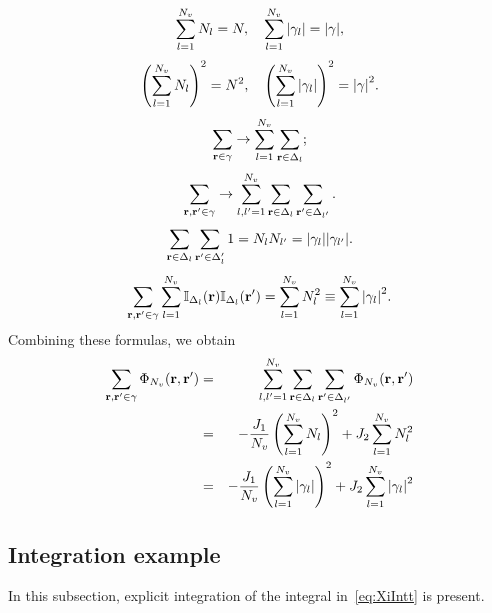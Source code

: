 \documentclass[12pt]{article}
\numberwithin{equation}{section}
\begin{document}
	\begin{equation}
		\label{eq:2}
		\sum_{l=1}^{N_v} N_l = N, \quad \sum_{l=1}^{N_v} \abs{\gamma_l} = \abs{\gamma},
	\end{equation}
	\begin{equation}
		\label{eq:3}
		\left(\sum_{l=1}^{N_v} N_l \right)^2 = N^2, \quad \left(\sum_{l=1}^{N_v} \abs{\gamma_l} \right)^2 = \abs{\gamma}^2.
	\end{equation}
	\begin{equation}
		\label{eq:4}
		\sum_{\vb{r} \in \gamma} \rightarrow \sum_{l=1}^{N_v} \sum_{\vb{r} \in \Delta_l};
	\end{equation}
	\begin{equation}
		\label{eq:5}
		\sum_{\vb{r}, \vb{r}' \in \gamma} \rightarrow \sum_{l,l'=1}^{N_v} \sum_{\vb{r} \in \Delta_l} \sum_{\vb{r}' \in \Delta_{l'}}.
	\end{equation}
	\begin{equation}
		\label{eq:6}
		\sum_{\vb{r} \in \Delta_l}\sum_{\vb{r}' \in \Delta_l'} 1 = N_l N_{l'} = \abs{\gamma_l} \abs{\gamma_{l'}}.
	\end{equation}
	\begin{equation}
		\label{eq:sumII}
		\sum_{\vb{r}, \vb{r}' \in \gamma}\sum_{l=1}^{N_v} \mathbb{I}_{\Delta_l}(\vb{r}) \mathbb{I}_{\Delta_{l}}(\vb{r}') = \sum_{l=1}^{N_v} N_l^2 \equiv \sum_{l=1}^{N_v} \abs{\gamma_l}^2.
	\end{equation}
	Combining these formulas, we obtain
	\begin{eqnarray}
		\sum_{\vb{r}, \vb{r}' \in \gamma} \Phi_{N_v}(\vb{r}, \vb{r}') & = & \sum_{l,l'=1}^{N_v} \sum_{\vb{r} \in \Delta_l} \sum_{\vb{r}' \in \Delta_{l'}} \Phi_{N_v}(\vb{r}, \vb{r}')
		\nonumber\\
		& = & - \frac{J_1}{N_v} \left(\sum_{l=1}^{N_v} N_l\right)^2 + J_2\sum_{l=1}^{N_v}N_l^2
		\\
		& = & - \frac{J_1}{N_v} \left(\sum_{l=1}^{N_v} \abs{\gamma_l}\right)^2 + J_2\sum_{l=1}^{N_v}\abs{\gamma_l}^2
	\end{eqnarray}
	
	\subsection{Integration example}
	\label{subsec:int}
	In this subsection, explicit integration of the integral in~\eqref{eq:XiIntt} is present.
	
\end{document}

